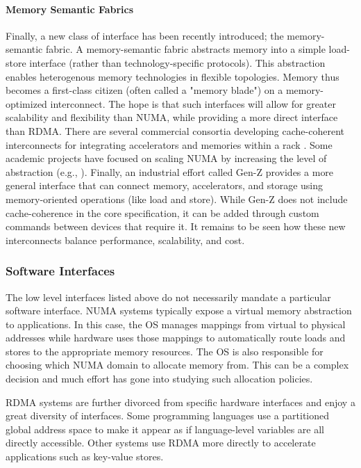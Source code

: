 \paragraph{Memory Semantic Fabrics}
Finally, a new class of interface has been recently introduced; the
memory-semantic fabric. A memory-semantic fabric abstracts memory into a simple
load-store interface (rather than technology-specific protocols). This
abstraction enables heterogenous memory technologies in flexible topologies.
Memory thus becomes a first-class citizen (often called a "memory blade") on a
memory-optimized interconnect. The hope is that such interfaces will allow for
greater scalability and flexibility than NUMA, while providing a more direct
interface than RDMA. There are several commercial consortia developing
cache-coherent interconnects for integrating accelerators and memories within a
rack \cite{ccix}\cite{capi}. Some academic projects have focused on scaling
NUMA by increasing the level of abstraction (e.g.,
\cite{sonuma}\cite{lim_disag}).  Finally, an industrial effort called Gen-Z
provides a more general interface that can connect memory, accelerators, and
storage using memory-oriented operations (like load and store)\cite{genz}.
While Gen-Z does not include cache-coherence in the core specification, it can
be added through custom commands between devices that require it. It remains to
be seen how these new interconnects balance performance, scalability, and cost.

\subsubsection{Software Interfaces} The low level interfaces listed above do
not necessarily mandate a particular software interface. NUMA systems typically
expose a virtual memory abstraction to applications. In this case, the OS
manages mappings from virtual to physical addresses while hardware uses those
mappings to automatically route loads and stores to the appropriate memory
resources. The OS is also responsible for choosing which NUMA domain to
allocate memory from. This can be a complex decision and much effort has gone
into studying such allocation policies\cite{linux_numa}.

RDMA systems are further divorced from specific hardware interfaces and enjoy a
great diversity of interfaces. Some programming languages use a partitioned
global address space to make it appear as if language-level variables are all
directly accessible\cite{upc}\cite{grappa}. Other systems use RDMA more
directly to accelerate applications such as key-value
stores\cite{ramcloud}\cite{farm}.


